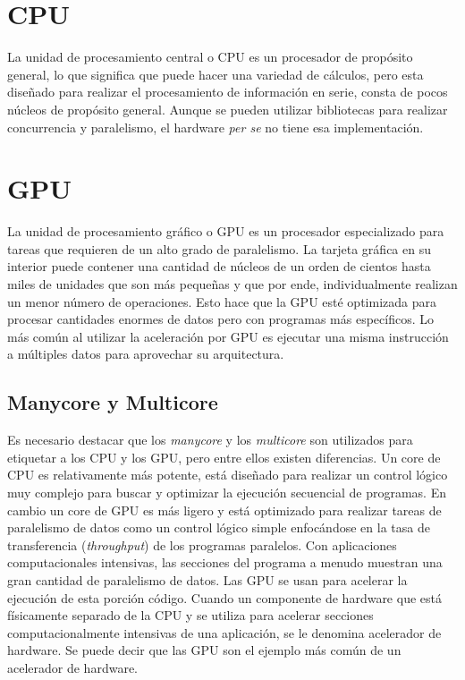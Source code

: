 \section{CPU}
La unidad de procesamiento central o CPU es un procesador de propósito general, lo que significa que puede hacer una variedad de cálculos, pero esta diseñado para realizar el procesamiento de información en serie, consta de pocos núcleos de propósito general. Aunque se pueden utilizar bibliotecas para realizar concurrencia y paralelismo, el hardware \textit{per se} no tiene esa implementación.

\section{GPU}
La unidad de procesamiento gráfico o GPU es un procesador especializado para tareas que requieren de un alto grado de paralelismo. La tarjeta gráfica en su interior puede contener una cantidad de núcleos de un orden de cientos hasta miles de unidades que son más pequeñas y que por ende, individualmente realizan un menor número de operaciones. Esto hace que la GPU esté optimizada para procesar cantidades enormes de datos pero con programas más específicos\cite{gpgpu}. Lo más común al utilizar la aceleración por GPU es ejecutar una misma instrucción a múltiples datos para aprovechar su arquitectura.

\subsection{Manycore y Multicore}
Es necesario destacar que los \textit{manycore} y los \textit{multicore} son utilizados para etiquetar a los CPU y los GPU, pero entre ellos existen diferencias. 
Un core de CPU es relativamente más potente, está diseñado para realizar un control lógico muy complejo para buscar y optimizar la ejecución secuencial de programas.
\vspace{0.3cm}
En cambio un core de GPU es más ligero y está optimizado para realizar tareas de paralelismo de datos como un control lógico simple enfocándose en la tasa de transferencia (\textit{throughput}) de los programas paralelos.
\vspace{0.3cm}
Con aplicaciones computacionales intensivas, las secciones del programa a menudo muestran una gran cantidad de paralelismo de datos. Las GPU se usan para acelerar la ejecución de esta porción código. Cuando un componente de hardware que está físicamente separado de la CPU y se utiliza para acelerar secciones computacionalmente intensivas de una aplicación, se le denomina acelerador de hardware. Se puede decir que las GPU son el ejemplo más común de un acelerador de hardware.

